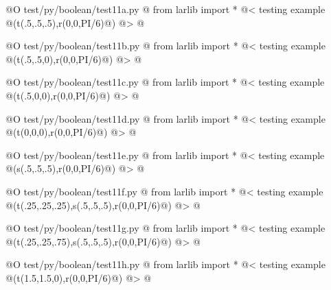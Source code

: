 \documentclass[11pt,oneside]{article}    %
\begin{document}
@O test/py/boolean/test11a.py @{
from larlib import *
@< testing example @(t(.5,.5,.5),r(0,0,PI/6)@) @>  
@}

@O test/py/boolean/test11b.py @{
from larlib import *
@< testing example @(t(.5,.5,0),r(0,0,PI/6)@) @>
@}

@O test/py/boolean/test11c.py @{
from larlib import *
@< testing example @(t(.5,0,0),r(0,0,PI/6)@) @>
@}

@O test/py/boolean/test11d.py @{
from larlib import *
@< testing example @(t(0,0,0),r(0,0,PI/6)@) @>
@}

@O test/py/boolean/test11e.py @{
from larlib import *
@< testing example @(s(.5,.5,.5),r(0,0,PI/6)@) @>
@}

@O test/py/boolean/test11f.py @{
from larlib import *
@< testing example @(t(.25,.25,.25),s(.5,.5,.5),r(0,0,PI/6)@) @>
@}

@O test/py/boolean/test11g.py @{
from larlib import *
@< testing example @(t(.25,.25,.75),s(.5,.5,.5),r(0,0,PI/6)@) @>
@}

@O test/py/boolean/test11h.py @{
from larlib import *
@< testing example @(t(1.5,1.5,0),r(0,0,PI/6)@) @>
@}
\end{document}
